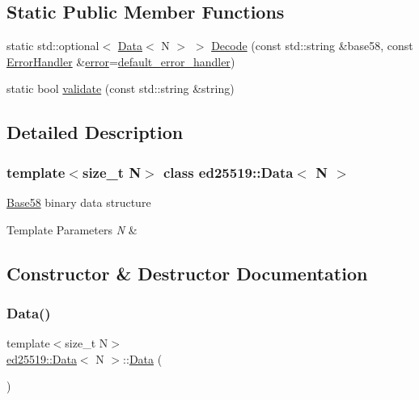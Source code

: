 \subsection*{Static Public Member Functions}
\begin{DoxyCompactItemize}
\item 
static std\+::optional$<$ \mbox{\hyperlink{classed25519_1_1_data}{Data}}$<$ N $>$ $>$ \mbox{\hyperlink{classed25519_1_1_data_a289015b1f2c8c57fed156d0f18059968}{Decode}} (const std\+::string \&base58, const \mbox{\hyperlink{namespaceed25519_a6ba572942b3c18591fc869d52a6b16e6}{Error\+Handler}} \&\mbox{\hyperlink{namespaceed25519_ac93d0b5156eaca22197055e902920bc4}{error}}=\mbox{\hyperlink{namespaceed25519_a7c7bb6ed17541162959c33ed3e3b15fb}{default\+\_\+error\+\_\+handler}})
\item 
static bool \mbox{\hyperlink{classed25519_1_1_data_ade9c93cb08f9d60aa45e75821ed1bcbe}{validate}} (const std\+::string \&string)
\end{DoxyCompactItemize}


\subsection{Detailed Description}
\subsubsection*{template$<$size\+\_\+t N$>$\newline
class ed25519\+::\+Data$<$ N $>$}

\mbox{\hyperlink{classed25519_1_1_base58}{Base58}} binary data structure 
\begin{DoxyTemplParams}{Template Parameters}
{\em N} & \\
\hline
\end{DoxyTemplParams}


\subsection{Constructor \& Destructor Documentation}
\mbox{\label{classed25519_1_1_data_a2c637587095d6527cd4136926fb8b452}} 
\subsubsection{\texorpdfstring{Data()}{Data()}}
{\footnotesize\ttfamily template$<$size\+\_\+t N$>$ \\
\mbox{\hyperlink{classed25519_1_1_data}{ed25519\+::\+Data}}$<$ N $>$\+::\mbox{\hyperlink{classed25519_1_1_data}{Data}} (\begin{DoxyParamCaption}{ }\end{DoxyParamCaption})\hspace{0.3cm}{\ttfamily [inline]}}



